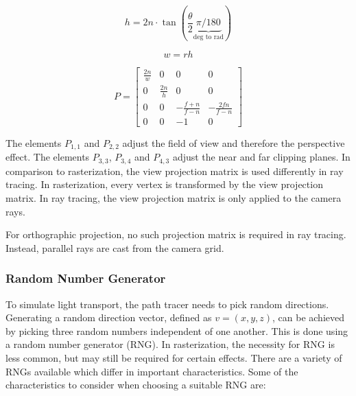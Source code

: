 \begin{equation}
    \label{eqn:perspectiveProjectionHeight}
    h = 2n \cdot \tan(\frac{\theta}{2} \underbrace{\pi / 180}_{\text{deg to rad}})
\end{equation}

\begin{equation}
    \label{eqn:perspectiveProjectionWidth}
    w = rh
\end{equation}

\begin{equation}
    \label{eqn:perspectiveProjectionMatrix}
    P = 
    \begin{bmatrix}
        \frac{2n}{w} & 0 & 0 & 0 \\
        0 & \frac{2n}{h} & 0 & 0 \\
        0 & 0 & -\frac{f + n}{f - n} & -\frac{2fn}{f - n} \\
        0 & 0 & -1 & 0
    \end{bmatrix}
\end{equation}

The elements $P_{1,1}$ and $P_{2,2}$ adjust the field of view and therefore the perspective effect. The elements $P_{3,3}$, $P_{3,4}$ and $P_{4,3}$ adjust the near and far clipping planes. In comparison to rasterization, the view projection matrix is used differently in ray tracing. In rasterization, every vertex is transformed by the view projection matrix. In ray tracing, the view projection matrix is only applied to the camera rays.

For orthographic projection, no such projection matrix is required in ray tracing. Instead, parallel rays are cast from the camera grid.

\subsubsection{Random Number Generator}
  
To simulate light transport, the path tracer needs to pick random directions. Generating a random direction vector, defined as $v = (x, y, z)$, can be achieved by picking three random numbers independent of one another. This is done using a random number generator (\gls{RNG}). In rasterization, the necessity for \gls{RNG} is less common, but may still be required for certain effects. There are a variety of \glspl{RNG} available which differ in important characteristics. Some of the characteristics to consider when choosing a suitable \gls{RNG} are:

